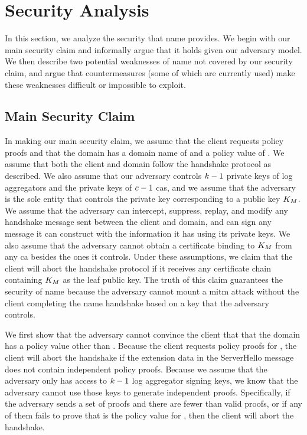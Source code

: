 \section{Security Analysis}
\label{sec:analysis}

In this section, we analyze the security that \ac{name} provides. We begin with
our main security claim and informally argue that it holds given our adversary
model. We then describe two potential weaknesses of \ac{name} not covered by our
security claim, and argue that countermeasures (some of which are currently
used) make these weaknesses difficult or impossible to exploit.


\subsection{Main Security Claim}
\label{sec:analysis:informal}

In making our main security claim, we assume that the client requests \numlas
policy proofs and that the domain has a domain name of \domain and a policy
value of \policy. We assume that both the client and domain follow the handshake
protocol as described. We also assume that our adversary controls $k - 1$
private keys of log aggregators and the private keys of $c - 1$ \acp{ca},
and we assume that the adversary is the sole entity that controls the private
key corresponding to a public key $K_M$. We assume that the adversary
can intercept, suppress, replay, and modify any handshake message sent between
the client and domain, and can sign any message it can construct with the
information it has using its private keys. We also assume that the adversary
cannot obtain a certificate binding \domain to $K_M$ from any \ac{ca}
besides the ones it controls. Under these assumptions, we claim that the client
will abort the handshake protocol if it receives any certificate chain
containing $K_M$ as the leaf public key. The truth of this claim
guarantees the security of \ac{name} because the adversary cannot mount a
\ac{mitm} attack without the client completing the \ac{name} handshake based on
a key that the adversary controls.

We first show that the adversary cannot convince the client that that the domain
has a policy value other than \policy. Because the client requests \numlas
policy proofs for \domain, the client will abort the handshake if the extension
data in the ServerHello message does not contain \numlas independent policy
proofs. Because we assume that the adversary only has access to $k - 1$
log aggregator signing keys, we know that the adversary cannot use those keys to
generate \numlas independent proofs. Specifically, if the adversary sends a set
of proofs and there are fewer than \numlas valid proofs, or if any of them fails
to prove that \policy is the policy value for \domain, then the client will
abort the handshake.

